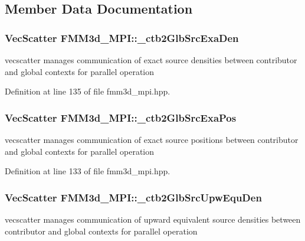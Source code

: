 \subsection{Member Data Documentation}
\subsubsection{\setlength{\rightskip}{0pt plus 5cm}Vec\-Scatter {\bf FMM3d\_\-MPI::\_\-ctb2Glb\-Src\-Exa\-Den}\hspace{0.3cm}{\tt  [protected]}}\label{classFMM3d__MPI_3c7452d96052ee134de920383098f1a5_3c7452d96052ee134de920383098f1a5}


vecscatter manages communication of exact source densities between contributor and global contexts for parallel operation 

Definition at line 135 of file fmm3d\_\-mpi.hpp.
\subsubsection{\setlength{\rightskip}{0pt plus 5cm}Vec\-Scatter {\bf FMM3d\_\-MPI::\_\-ctb2Glb\-Src\-Exa\-Pos}\hspace{0.3cm}{\tt  [protected]}}\label{classFMM3d__MPI_fe356aea735d34fae80c6d7caf9cd872_fe356aea735d34fae80c6d7caf9cd872}


vecscatter manages communication of exact source positions between contributor and global contexts for parallel operation 

Definition at line 133 of file fmm3d\_\-mpi.hpp.
\subsubsection{\setlength{\rightskip}{0pt plus 5cm}Vec\-Scatter {\bf FMM3d\_\-MPI::\_\-ctb2Glb\-Src\-Upw\-Equ\-Den}\hspace{0.3cm}{\tt  [protected]}}\label{classFMM3d__MPI_a830981126acc4d268c9f8798b37ebf5_a830981126acc4d268c9f8798b37ebf5}


vecscatter manages communication of upward equivalent source densities between contributor and global contexts for parallel operation 

